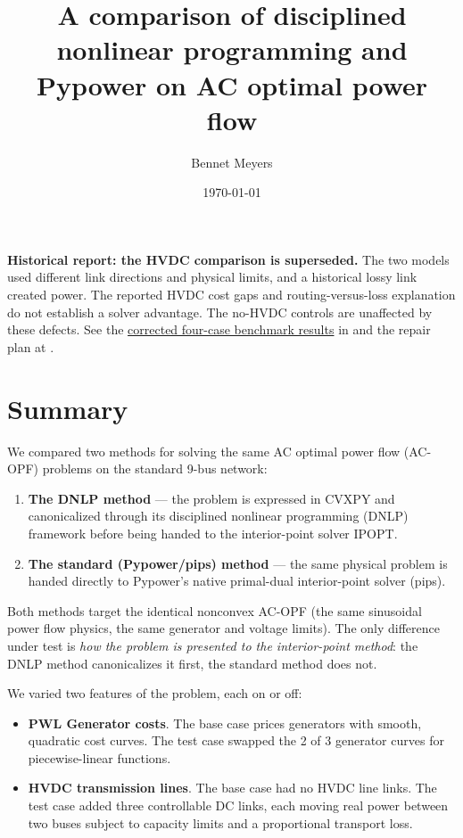\documentclass[11pt]{article}
\title{A comparison of disciplined nonlinear programming and\\
Pypower on AC optimal power flow}
\author{Bennet Meyers}
\date{\today}
\begin{document}
\maketitle

\noindent\textbf{Historical report: the HVDC comparison is superseded.}
The two models used different link directions and physical limits, and a
historical lossy link created power. The reported HVDC cost gaps and
routing-versus-loss explanation do not establish a solver advantage.
The no-HVDC controls are unaffected by these defects. See the
\href{../case9_matched_comparison/REPORT.md}{corrected four-case benchmark results}
in  and the repair plan
at .

\section{Summary}

We compared two methods for solving the same AC optimal power flow (AC-OPF)
problems on the standard 9-bus network:

\begin{enumerate}
  \item \textbf{The DNLP method} --- the problem is expressed in CVXPY and
    canonicalized through its disciplined nonlinear programming (DNLP)
    framework before being handed to the interior-point solver IPOPT.
  \item \textbf{The standard (Pypower/pips) method} --- the same physical
    problem is handed directly to Pypower's native primal-dual interior-point
    solver (pips).
\end{enumerate}

Both methods target the identical nonconvex AC-OPF (the same sinusoidal power
flow physics, the same generator and voltage limits). The only difference under
test is \emph{how the problem is presented to the interior-point method}: the
DNLP method canonicalizes it first, the standard method does not.

We varied two features of the problem, each on or off:

\begin{itemize}
  \item \textbf{PWL Generator costs}. The base case prices generators with smooth,
    quadratic cost curves. The test case swapped the 2 of 3 generator curves for
    piecewise-linear functions.
  \item \textbf{HVDC transmission lines}. The base case had no HVDC line links.
    The test case added three controllable DC links, each moving real power
    between two buses subject to capacity limits and a proportional transport
    loss.
\end{itemize}
\end{document}
